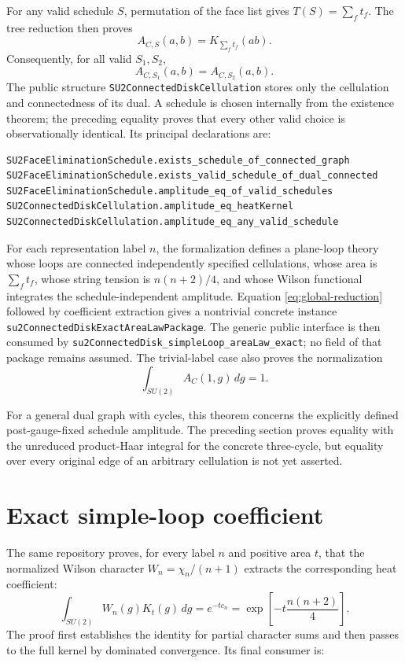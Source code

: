 \documentclass[11pt,a4paper]{article}
\theoremstyle{remark}
\begin{document}
For any valid schedule $S$, permutation of the face list gives
$T(S)=\sum_f t_f$.  The tree reduction then proves
\begin{equation}\label{eq:global-reduction}
  A_{C,S}(a,b)=K_{\sum_f t_f}(ab).
\end{equation}
Consequently, for all valid $S_1,S_2$,
\[
  A_{C,S_1}(a,b)=A_{C,S_2}(a,b).
\]
The public structure \texttt{SU2ConnectedDiskCellulation} stores only the
cellulation and connectedness of its dual.  A schedule is chosen internally
from the existence theorem; the preceding equality proves that every other
valid choice is observationally identical.  Its principal declarations are:
\begin{lstlisting}
SU2FaceEliminationSchedule.exists_schedule_of_connected_graph
SU2FaceEliminationSchedule.exists_valid_schedule_of_dual_connected
SU2FaceEliminationSchedule.amplitude_eq_of_valid_schedules
SU2ConnectedDiskCellulation.amplitude_eq_heatKernel
SU2ConnectedDiskCellulation.amplitude_eq_any_valid_schedule
\end{lstlisting}

For each representation label $n$, the formalization defines a plane-loop
theory whose loops are connected independently specified cellulations, whose
area is $\sum_f t_f$, whose string tension is $n(n+2)/4$, and whose Wilson
functional integrates the schedule-independent amplitude.  Equation
\eqref{eq:global-reduction} followed by
coefficient extraction gives a nontrivial concrete instance
\texttt{su2ConnectedDiskExactAreaLawPackage}.  The generic public interface is
then consumed by
\texttt{su2ConnectedDisk\_simpleLoop\_areaLaw\_exact}; no field of that
package remains assumed.  The trivial-label case also proves the normalization
\[
  \int_{SU(2)} A_C(1,g)\,dg=1.
\]

For a general dual graph with cycles, this theorem concerns the explicitly
defined post-gauge-fixed schedule amplitude.  The preceding section proves
equality with the unreduced product-Haar integral for the concrete three-cycle,
but equality over every original edge of an arbitrary cellulation is not yet
asserted.

\section{Exact simple-loop coefficient}

The same repository proves, for every label $n$ and positive area $t$, that
the normalized Wilson character $W_n=\chi_n/(n+1)$ extracts the corresponding
heat coefficient:
\[
  \int_{SU(2)}W_n(g)K_t(g)\,dg
  =e^{-t c_n}
  =\exp\!\left[-t\frac{n(n+2)}4\right].
\]
The proof first establishes the identity for partial character sums and then
passes to the full kernel by dominated convergence.  Its final consumer is:
\end{document}
